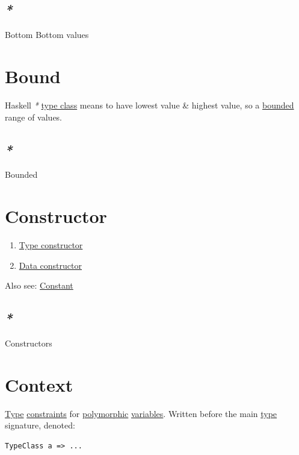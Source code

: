 \documentclass[a4paper,14pt,oneside]{book}
\begin{document}
\subsection{\emph{*}}
\label{sec:orgcb80511}

\label{org01741fa}Bottom
\label{org7923e7f}Bottom values

\section{\label{org70371c4}Bound}
\label{sec:org33cb624}
Haskell \emph{*} \hyperref[org4b105c4]{type class} means to have lowest value \& highest value, so a \hyperref[org82154e5]{bounded} range of values.

\subsection{\emph{*}}
\label{sec:org094e966}

\label{org82154e5}Bounded

\section{\label{org93e13b6}Constructor}
\label{sec:org49bb551}
\begin{enumerate}
\item \hyperref[orgb31668f]{Type constructor}
\item \hyperref[orgb1a2b7f]{Data constructor}
\end{enumerate}

Also see: \hyperref[org5f03168]{Constant}

\subsection{\emph{*}}
\label{sec:orgb4bdf04}

\label{org04dd32d}Constructors

\section{\label{orgd7d1033}Context}
\label{sec:org12c6011}
\hyperref[orgde40363]{Type} \hyperref[org657c236]{constraints} for \hyperref[org5b122e2]{polymorphic} \hyperref[org0a49518]{variables}.
Written before the main \hyperref[orgde40363]{type} signature, denoted:
\begin{verbatim}
TypeClass a => ...
\end{verbatim}
\end{document}
